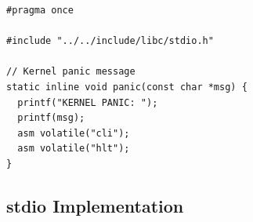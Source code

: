 \documentclass[../main.tex]{subfiles}
\begin{document}
\label{lst:system_h}
\begin{verbatim}
#pragma once

#include "../../include/libc/stdio.h"

// Kernel panic message
static inline void panic(const char *msg) {
  printf("KERNEL PANIC: ");
  printf(msg);
  asm volatile("cli");
  asm volatile("hlt");
}

\end{verbatim}


\subsection{stdio Implementation}
\label{apx:stdio_implementation}
\end{document}
